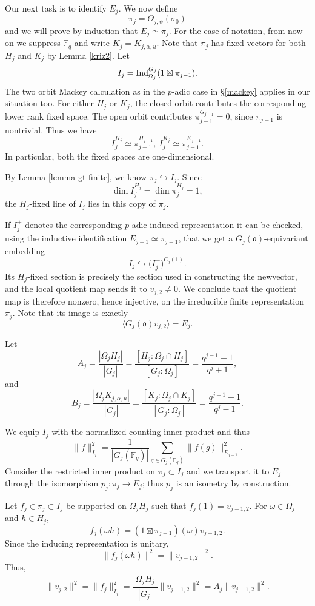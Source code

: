 \documentclass[12pt]{amsart}
\theoremstyle{definition}
\theoremstyle{remark}
\begin{document}
Our next task is to identify $E_j$. 
We now define
\[
\pi_j=\Theta_{j,\psi}(\sigma_0)
\]
and we will prove by induction that $E_j \simeq \pi_j$. 
For the ease of notation, from now on we suppress $\mathbb F_q$ and write $K_j=K_{j,\alpha,u}$. 
Note that $\pi_j$ has fixed vectors for both $H_j$ and $K_j$ by Lemma \ref{kriz2}. 
Let
\[
I_j
={\rm Ind}_{\Omega_j}^{G_j}
( 1\boxtimes\pi_{j-1}).
\]
The two orbit Mackey calculation as in the $p$-adic case in \S \ref{mackey} applies in our situation too.
For either $H_j$ or $K_j$, the closed orbit contributes the corresponding lower rank fixed space. The open orbit contributes $\pi_{j-1}^{G_{j-1}} = 0$, since $\pi_{j-1}$ is nontrivial. Thus we have
\[
I_j^{H_j}
\simeq\pi_{j-1}^{H_{j-1}},
~
I_j^{K_j}
\simeq\pi_{j-1}^{K_{j-1}}.
\]
In particular, both the fixed spaces are one-dimensional.

By Lemma \ref{lemma-gt-finite}, we know $\pi_j \hookrightarrow I_j$. Since
\[
\dim I_j^{H_j}
=\dim\pi_j^{H_j}=1,
\]
the $H_j$-fixed line of $I_j$ lies in this copy of $\pi_j$.

If $I_j^+$ denotes the corresponding $p$-adic induced representation it can be checked,
using the inductive identification $E_{j-1}\simeq\pi_{j-1}$, that we get a $G_j(\mathfrak o)$-equivariant embedding
\[
I_j\hookrightarrow\mathcal (I_j^+)^{C_j(1)}.
\]
Its $H_j$-fixed section is precisely the section used in constructing the newvector, and the local quotient map sends it to $v_{j,2}\ne0$. We conclude that the quotient map is therefore nonzero, hence injective, on the irreducible finite representation $\pi_j$. Note that its image is exactly
\[
\langle G_j(\mathfrak o)v_{j,2}\rangle=E_j.
\]

Let
\[
A_j
=\frac{|\Omega_jH_j|}{|G_j|}
=\frac{[H_j:\Omega_j\cap H_j]}{[G_j:\Omega_j]}
=\frac{q^{j-1}+1}{q^j+1},
\]
and
\[
B_j
=\frac{|\Omega_jK_{j,\alpha,u}|}{|G_j|}
=\frac{[K_j:\Omega_j\cap K_j]}
{[G_j:\Omega_j]}
=\frac{q^{j-1}-1}{q^j-1}.
\]

We equip $I_j$ with the normalized counting inner product and thus
\[
\|f\|_{I_j}^2
=\frac{1}{|G_j(\mathbb F_q)|}
\sum_{g\in G_j(\mathbb F_q)}\|f(g)\|_{E_{j-1}}^2.
\]
Consider the restricted inner product on $\pi_j\subset I_j$ and we transport it to $E_j$ through the isomorphism $p_j:\pi_j\to E_j$; thus $p_j$ is an isometry by construction. 

Let $f_j\in\pi_j\subset I_j$ be supported on $\Omega_j H_j$ such that $f_j(1)=v_{j-1,2}$. For $\omega\in\Omega_j$ and $h\in H_j$,
\[
f_j(\omega h)
=(1\boxtimes\pi_{j-1})(\omega)v_{j-1,2}.
\]
Since the inducing representation is unitary,
\[
\|f_j(\omega h)\|^2=\|v_{j-1,2}\|^2.
\]
Thus,
\[
\|v_{j,2}\|^2 =
\|f_j\|_{I_j}^2
=
\frac{|\Omega_j H_j|}
{|G_j|}
\|v_{j-1,2}\|^2
=A_j\|v_{j-1,2}\|^2.
\]
\end{document}
